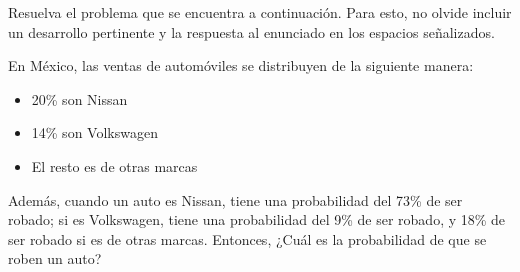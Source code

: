 \documentclass{cdplf-prueba}
\begin{document}
%
\begin{tcbraster}[enhanced,raster columns=3,raster width=\linewidth,raster column skip=3pt,raster force size=false]
    \begin{caja}[title={\sffamily\scshape\bfseries Nombre},height=30pt,add to width=4cm]
    \end{caja}
    \begin{caja}[title={\sffamily\scshape\bfseries Puntaje},height=30pt,add to width=-2cm]
    \end{caja}
    \begin{caja}[title={\sffamily\scshape\bfseries Nota},height=30pt,add to width=-2cm]
    \end{caja}                    
\end{tcbraster}
%
\vspace*{10pt}
\begin{tcolorbox}[boxrule=1pt,colback=white,leftrule=3mm]
    \raggedright Resuelva el problema que se encuentra a continuación. Para esto, no olvide 
    incluir un desarrollo pertinente y la respuesta al enunciado en los espacios señalizados.        
\end{tcolorbox}
%
En México, las ventas de automóviles se distribuyen de la siguiente manera:
\begin{itemize}
    \item 20\% son Nissan
    \item 14\% son Volkswagen
    \item El resto es de otras marcas
\end{itemize}
Además, cuando un auto es Nissan, tiene una probabilidad del 73\% de ser robado; 
si es Volkswagen, tiene una probabilidad del 9\% de ser robado, y 18\% de 
ser robado si es de otras marcas. Entonces, ¿Cuál es la probabilidad de que 
se roben un auto?
\begin{desarrollo}[height=10cm]
\end{desarrollo}
\begin{respuesta}[height=2cm]
\end{respuesta}
\end{document}
